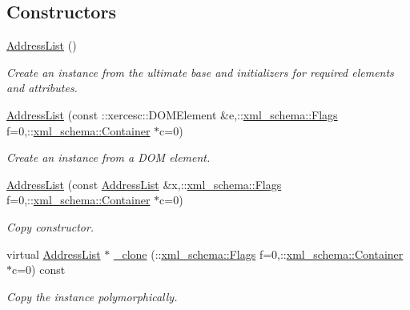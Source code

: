 \subsection*{Constructors}
\begin{DoxyCompactItemize}
\item 
\hypertarget{classopenstack_1_1xml_1_1AddressList_a2c96b6e8333b6cc53c61171fe1d3118e}{
\hyperlink{classopenstack_1_1xml_1_1AddressList_a2c96b6e8333b6cc53c61171fe1d3118e}{AddressList} ()}
\label{classopenstack_1_1xml_1_1AddressList_a2c96b6e8333b6cc53c61171fe1d3118e}

\begin{DoxyCompactList}\small\item\em Create an instance from the ultimate base and initializers for required elements and attributes. \item\end{DoxyCompactList}\item 
\hyperlink{classopenstack_1_1xml_1_1AddressList_a0172f2b6d4ee56870b9987e7de177b88}{AddressList} (const ::xercesc::DOMElement \&e,::\hyperlink{namespacexml__schema_affb4c227cbd9aa7453dd1dc5a1401943}{xml\_\-schema::Flags} f=0,::\hyperlink{namespacexml__schema_a333dea2213742aea47a37532dec4ec27}{xml\_\-schema::Container} $\ast$c=0)
\begin{DoxyCompactList}\small\item\em Create an instance from a DOM element. \item\end{DoxyCompactList}\item 
\hyperlink{classopenstack_1_1xml_1_1AddressList_a0a97380e4f8e8c1dcbc02a209bab9b3f}{AddressList} (const \hyperlink{classopenstack_1_1xml_1_1AddressList}{AddressList} \&x,::\hyperlink{namespacexml__schema_affb4c227cbd9aa7453dd1dc5a1401943}{xml\_\-schema::Flags} f=0,::\hyperlink{namespacexml__schema_a333dea2213742aea47a37532dec4ec27}{xml\_\-schema::Container} $\ast$c=0)
\begin{DoxyCompactList}\small\item\em Copy constructor. \item\end{DoxyCompactList}\item 
virtual \hyperlink{classopenstack_1_1xml_1_1AddressList}{AddressList} $\ast$ \hyperlink{classopenstack_1_1xml_1_1AddressList_a964ff493a6f226a4b92fdf53074d54c3}{\_\-clone} (::\hyperlink{namespacexml__schema_affb4c227cbd9aa7453dd1dc5a1401943}{xml\_\-schema::Flags} f=0,::\hyperlink{namespacexml__schema_a333dea2213742aea47a37532dec4ec27}{xml\_\-schema::Container} $\ast$c=0) const 
\begin{DoxyCompactList}\small\item\em Copy the instance polymorphically. \item\end{DoxyCompactList}\end{DoxyCompactItemize}


